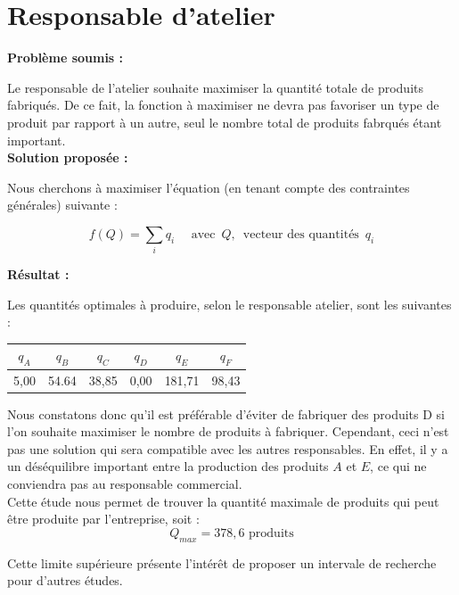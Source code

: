 \documentclass[paper=a4, fontsize=11pt]{report}
\numberwithin{equation}{section}		%
\numberwithin{figure}{section}			%
\numberwithin{table}{section}				%
\renewcommand{\bf}[1]{\textbf{#1}}
\begin{document}

\section{Responsable d'atelier}
\bf{Problème soumis :}

Le responsable de l'atelier souhaite maximiser la quantité totale de produits fabriqués. De ce fait, la fonction à maximiser ne devra pas favoriser un type de produit par rapport à un autre, seul le nombre total de produits fabrqués étant important.\\

\bf{Solution proposée :}

Nous cherchons à maximiser l'équation (en tenant compte des contraintes générales) suivante :

\[f(Q) = \sum_i q_i \quad \text{  avec } \, Q, \, \text{ vecteur des quantités } \, q_i \]

\bf{Résultat :}

Les quantités optimales à produire, selon le responsable atelier, sont les suivantes :

\begin{center}
\begin{tabular}{cccccc}
\hline 
$q_A$ & $q_B$ & $q_C$ & $q_D$ & $q_E$ & $q_F$ \\ 
\hline 
5,00 & 54.64 & 38,85 & 0,00 & 181,71 & 98,43 \\ 
\hline 
\end{tabular} 
\end{center}

Nous constatons donc qu'il est préférable d'éviter de fabriquer des produits D si l'on souhaite maximiser le nombre de produits à fabriquer. Cependant, ceci n'est pas une solution qui sera compatible avec les autres responsables. En effet, il y a un déséquilibre important entre la production des produits $A$ et $E$, ce qui ne conviendra pas au responsable commercial.\\

Cette étude nous permet de trouver la quantité maximale de produits qui peut être produite par l'entreprise, soit :
\[ Q_{max} = 378,6 \text{ produits}\]

Cette limite supérieure présente l'intérêt de proposer un intervale de recherche pour d'autres études.


\end{document}
